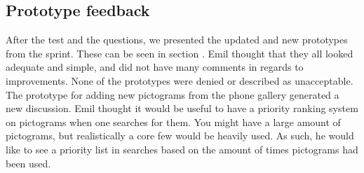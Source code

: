 \subsection{Prototype feedback}
After the test and the questions, we presented the updated and new prototypes from the sprint.
These can be seen in section .
Emil thought that they all looked adequate and simple, and did not have many comments in regards to improvements.
None of the prototypes were denied or described as unacceptable.
The prototype for adding new pictograms from the phone gallery generated a new discussion.
Emil thought it would be useful to have a priority ranking system on pictograms when one searches for them.
You might have a large amount of pictograms, but realistically a core few would be heavily used.
As such, he would like to see a priority list in searches based on the amount of times pictograms had been used.